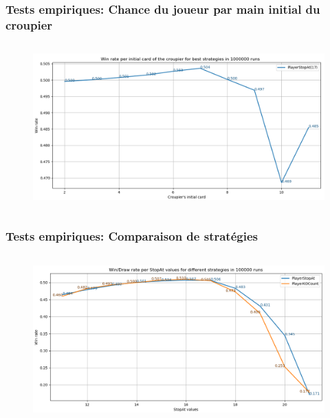 \documentclass{beamer}
\begin{document}
\begin{frame}
    \frametitle{Tests empiriques: Chance du joueur par main initial du croupier}
    \begin{columns}
        \column{\dimexpr\paperwidth-1pt}
        \begin{figure}[H]
            \begin{center}
                \includegraphics[width=1\textwidth]{empirical_graph2}
            \end{center}
        \end{figure}
    \end{columns}
\end{frame}

\begin{frame}
    \frametitle{Tests empiriques: Comparaison de stratégies}
    \begin{columns}
        \column{\dimexpr\paperwidth-1pt}
        \begin{figure}[H]
            \begin{center}
                \includegraphics[width=1\textwidth]{empirical_graph3}
            \end{center}
        \end{figure}
    \end{columns}
\end{frame}
\end{document}
